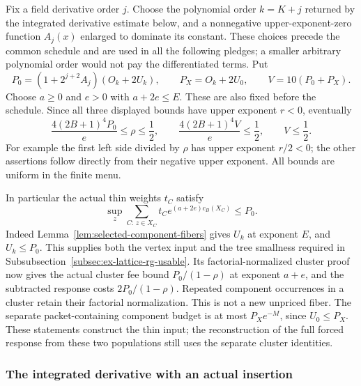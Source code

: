 Fix a field derivative order $j$. Choose the polynomial order
$k=K+j$ returned by the integrated derivative estimate below, and a
nonnegative upper-exponent-zero function $A_j(x)$ enlarged to dominate
its constant. These choices precede the common schedule and are used
in all the following pledges; a smaller arbitrary polynomial order
would not pay the differentiated terms. Put
\begin{equation}\label{eq:selected-thin-pledges}
 P_0=(1+2^{j+2}A_j)(O_k+2U_k),\qquad
 P_X=O_k+2U_0,\qquad V=10(P_0+P_X).
\end{equation}
Choose $a\ge0$ and $e>0$ with $a+2e\le E$. These are also fixed
before the schedule. Since all three displayed bounds have upper
exponent $r<0$, eventually
\begin{equation}\label{eq:selected-two-tree-smallness}
 \frac{4(2B+1)^4P_0}{e}\le\rho\le\frac12,
 \qquad \frac{4(2B+1)^4V}{e}\le\frac12,
 \qquad V\le\frac12.
\end{equation}
For example the first left side divided by $\rho$ has upper exponent
$r/2<0$; the other assertions follow directly from their negative
upper exponent. All bounds are uniform in the finite menu.

In particular the actual thin weights $t_C$ satisfy
\[
 \sup_z\sum_{C:\,z\in X_C}t_Ce^{(a+2e)c_B(X_C)}\le P_0.
\]
Indeed Lemma~\ref{lem:selected-component-fibers} gives $U_k$ at
exponent $E$, and $U_k\le P_0$. This supplies both the vertex input
and the tree smallness required in
Subsubsection~\ref{subsec:ex-lattice-rg-usable}. Its factorial-normalized
cluster proof now gives the actual cluster fee bound
$P_0/(1-\rho)$ at exponent $a+e$, and the subtracted response costs
$2P_0/(1-\rho)$. Repeated component occurrences in a cluster retain
their factorial normalization. This is not a new unpriced fiber.
The separate packet-containing component budget is at most
$P_Xe^{-M}$, since $U_0\le P_X$. These statements construct the
thin input; the reconstruction of the full forced response from
these two populations still uses the separate cluster identities.

\subsubsection{The integrated derivative with an actual insertion}
\label{sec:selected-inserted-derivative}

